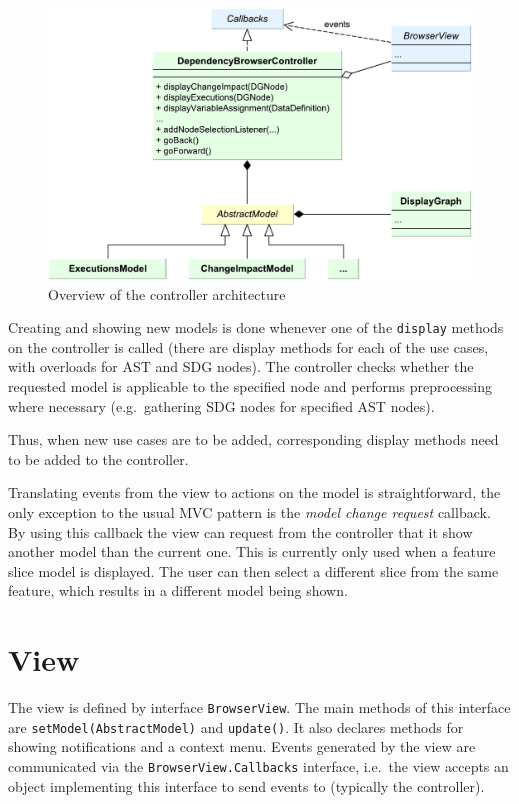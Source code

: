 \begin{figure}[htb]
  \centering
    \includegraphics[scale=0.6]{bilder/arch-controller}
  \caption{Overview of the controller architecture}
  \label{fig:arch-controller}
\end{figure}

Creating and showing new models is done whenever one of the \lstinline|display| methods on the controller is called 
(there are display methods for each of the use cases, with overloads for AST and SDG nodes). The controller checks 
whether the requested model is applicable to the specified node and performs preprocessing where necessary (e.g.\ 
gathering SDG nodes for specified AST nodes).

Thus, when new use cases are to be added, corresponding display methods need to be added to the controller.

Translating events from the view to actions on the model is straightforward, the only exception to the usual MVC 
pattern is the \emph{model change request} callback. By using this callback the view can request from the controller 
that it show another model than the current one. This is currently only used when a feature slice model is displayed. 
The user can then select a different slice from the same feature, which results in a different model being shown.


\section{View}

The view is defined by interface \lstinline|BrowserView|. The main methods of this interface are 
\lstinline|setModel(AbstractModel)| and \lstinline|update()|. It also declares methods for showing notifications and a 
context menu. Events generated by the view are communicated via the \lstinline|BrowserView.Callbacks| interface, i.e.\ 
the view accepts an object implementing this interface to send events to (typically the controller).

